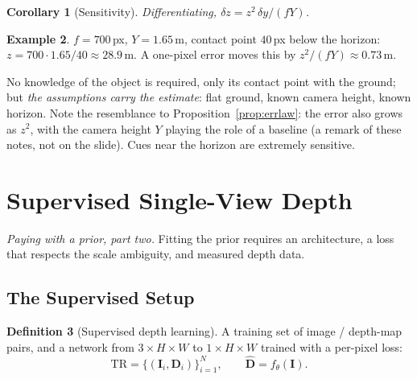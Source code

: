 \documentclass[11pt,a4paper]{article}
\theoremstyle{definition}
\newtheorem{definition}{Definition}[section]
\newtheorem{example}[definition]{Example}
\theoremstyle{plain}
\newtheorem{corollary}[definition]{Corollary}
\theoremstyle{remark}
\begin{document}
\begin{corollary}[Sensitivity]
Differentiating, $\delta z=z^2\,\delta y/(fY)$.
\end{corollary}
 
\begin{example}
$f=700$\,px, $Y=1.65$\,m, contact point $40$\,px below the horizon: $z=700\cdot1.65/40\approx28.9$\,m. A one-pixel error moves this by $z^2/(fY)\approx0.73$\,m.
\end{example}
 
\begin{intuition}
No knowledge of the object is required, only its contact point with the ground; but \emph{the assumptions carry the estimate}: flat ground, known camera height, known horizon. Note the resemblance to Proposition~\ref{prop:errlaw}: the error also grows as $z^2$, with the camera height $Y$ playing the role of a baseline (a remark of these notes, not on the slide). Cues near the horizon are extremely sensitive.
\end{intuition}
 
\section{Supervised Single-View Depth }
\emph{Paying with a prior, part two.} Fitting the prior requires an architecture, a loss that respects the scale ambiguity, and measured depth data.
 
\subsection{The Supervised Setup }
 
\begin{definition}[Supervised depth learning]
A training set of image / depth-map pairs, and a network from $3\times H\times W$ to $1\times H\times W$ trained with a per-pixel loss:
\[
\mathrm{TR}=\{(\bm I_i,\bm D_i)\}_{i=1}^{N},\qquad \hat{\bm D}=f_\theta(\bm I).
\]
\end{definition}
 
\end{document}
